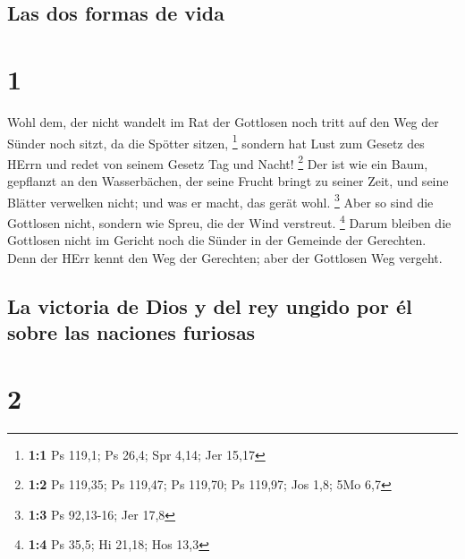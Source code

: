 \hypertarget{las-dos-formas-de-vida}{%
\subsection{Las dos formas de vida}\label{las-dos-formas-de-vida}}

\hypertarget{section}{%
\section{1}\label{section}}

 Wohl dem, der nicht wandelt im Rat der Gottlosen noch
tritt auf den Weg der Sünder noch sitzt, da die Spötter sitzen,
\footnote{\textbf{1:1} Ps 119,1; Ps 26,4; Spr 4,14; Jer 15,17}
 sondern hat Lust zum Gesetz des HErrn und redet von
seinem Gesetz Tag und Nacht! \footnote{\textbf{1:2} Ps 119,35; Ps
  119,47; Ps 119,70; Ps 119,97; Jos 1,8; 5Mo 6,7}  Der ist
wie ein Baum, gepflanzt an den Wasserbächen, der seine Frucht bringt zu
seiner Zeit, und seine Blätter verwelken nicht; und was er macht, das
gerät wohl. \footnote{\textbf{1:3} Ps 92,13-16; Jer 17,8} 
Aber so sind die Gottlosen nicht, sondern wie Spreu, die der Wind
verstreut. \footnote{\textbf{1:4} Ps 35,5; Hi 21,18; Hos 13,3}
 Darum bleiben die Gottlosen nicht im Gericht noch die
Sünder in der Gemeinde der Gerechten.  Denn der HErr kennt
den Weg der Gerechten; aber der Gottlosen Weg vergeht.

\hypertarget{la-victoria-de-dios-y-del-rey-ungido-por-uxe9l-sobre-las-naciones-furiosas}{%
\subsection{La victoria de Dios y del rey ungido por él sobre las
naciones
furiosas}\label{la-victoria-de-dios-y-del-rey-ungido-por-uxe9l-sobre-las-naciones-furiosas}}

\hypertarget{section-1}{%
\section{2}\label{section-1}}

